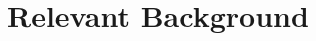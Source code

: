 \documentclass[letterpaper]{article} %
\begin{document}

\section{Relevant Background}




\end{document}
